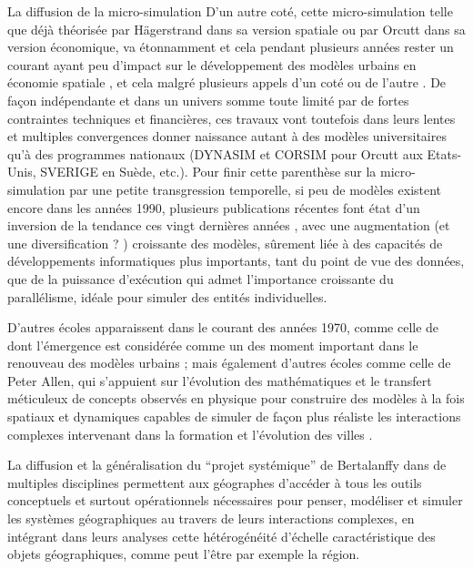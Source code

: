 \begin{framewithtitle}{ La diffusion de la micro-simulation }
D'un autre coté, cette micro-simulation telle que déjà théorisée par Hägerstrand dans sa version spatiale ou par Orcutt dans sa version économique, va étonnamment et cela pendant plusieurs années rester un courant ayant peu d'impact sur le développement des modèles urbains en économie spatiale \autocite[5]{Sanders2006}, et cela malgré plusieurs appels d'un coté \autocite{Hagerstrand1970} ou de l'autre \autocite[5]{Isard1998}. De façon indépendante et dans un univers somme toute limité par de fortes contraintes techniques et financières, ces travaux vont toutefois dans leurs lentes et multiples convergences donner naissance autant à des modèles universitaires qu'à des programmes nationaux (DYNASIM et CORSIM pour Orcutt aux Etats-Unis, SVERIGE en Suède, etc.). Pour finir cette parenthèse sur la micro-simulation par une petite transgression temporelle, si peu de modèles existent encore dans les années 1990, plusieurs publications récentes font état d'un inversion de la tendance ces vingt dernières années \autocite{Lenormand2013}, avec une augmentation (et une diversification ? ) croissante des modèles, sûrement liée à des capacités de développements informatiques plus importants, tant du point de vue des données, que de la puissance d’exécution qui admet l'importance croissante du parallélisme, idéale pour simuler des entités individuelles. \autocites[5]{Sanders2006}{Lenormand2013}

\end{framewithtitle}

D'autres écoles apparaissent dans le courant des années 1970, comme celle de \textcite{Wilson1970} dont l'émergence est considérée comme un des moment important dans le renouveau des modèles urbains \autocite{Griffith2010}; mais également d'autres écoles comme celle de Peter Allen, qui s'appuient sur l'évolution des mathématiques et le transfert méticuleux de concepts observés en physique pour construire des modèles à la fois spatiaux et dynamiques capables de simuler de façon plus réaliste les interactions complexes intervenant dans la formation et l'évolution des villes \autocites[11]{Batty1976}{Batty2001}[27-28]{Pumain2003} .  

La diffusion et la généralisation du \enquote{projet systémique} de Bertalanffy dans de multiples disciplines permettent aux géographes d'accéder à tous les outils conceptuels et surtout opérationnels \autocite{Forrester1969} nécessaires pour penser, modéliser et simuler les systèmes géographiques au travers de leurs interactions complexes, en intégrant dans leurs analyses cette hétérogénéité d'échelle caractéristique des objets géographiques, comme peut l'être par exemple la région. 

